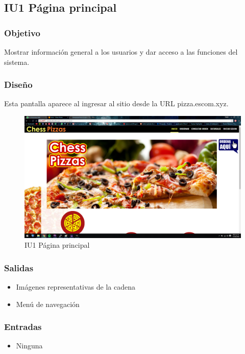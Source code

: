 \documentclass[oneside,10pt]{book}
\begin{document}
\subsection{IU1 Página principal}

\subsubsection{Objetivo}
Mostrar información general a los usuarios y dar acceso a las funciones del sistema.

\subsubsection{Diseño}
Esta pantalla aparece al ingresar al sitio desde la URL pizza.escom.xyz.

\begin{figure}[htbp!]
	\centering
	\includegraphics[width=1\textwidth]{img/principal}
	\caption{IU1 Página principal}
\end{figure}


\subsubsection{Salidas}
\begin{itemize} 
	\item Imágenes representativas de la cadena
	\item Menú de navegación
\end{itemize}
\subsubsection{Entradas}
\begin{itemize}
	\item Ninguna
\end{itemize}
\end{document}
